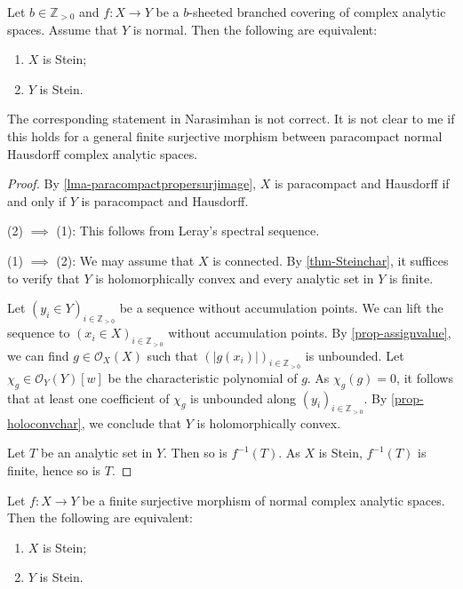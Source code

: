 \begin{lemma}\label{lma-branchedcovstein}
    Let $b\in \mathbb{Z}_{>0}$ and  $f:X\rightarrow Y$ be a $b$-sheeted branched covering of complex analytic spaces. Assume that $Y$ is normal. Then the following are equivalent:
    \begin{enumerate}
        \item $X$ is Stein;
        \item $Y$ is Stein.
    \end{enumerate}
\end{lemma}
The corresponding statement in Narasimhan is not correct. It is not clear to me if this holds for a general finite surjective morphism between paracompact normal Hausdorff complex analytic spaces.
\begin{proof}
    By \cref{lma-paracompactpropersurjimage}, $X$ is paracompact and Hausdorff if and only if $Y$ is paracompact and Hausdorff.

    (2) $\implies$ (1): This follows from Leray's spectral sequence.

    (1) $\implies$ (2): We may assume that $X$ is connected. 
    By \cref{thm-Steinchar}, it suffices to verify that $Y$ is holomorphically convex and every analytic set in $Y$ is finite.
    
    Let $(y_i\in Y)_{i\in \mathbb{Z}_{>0}}$ be a sequence without accumulation points. We can lift the sequence to $(x_i\in X)_{i\in \mathbb{Z}_{>0}}$ without accumulation points. By \cref{prop-assignvalue}, we can find $g\in \mathcal{O}_X(X)$ such that $(|g(x_i)|)_{i\in \mathbb{Z}_{>0}}$ is unbounded. Let $\chi_g\in \mathcal{O}_Y(Y)[w]$ be the characteristic polynomial of $g$. As $\chi_g(g)=0$, it follows that at least one coefficient of $\chi_g$ is unbounded along $(y_i)_{i\in \mathbb{Z}_{>0}}$. By \cref{prop-holoconvchar}, we conclude that $Y$ is holomorphically convex.

    Let $T$ be an analytic set in $Y$. Then so is $f^{-1}(T)$. As $X$ is Stein, $f^{-1}(T)$ is finite, hence so is $T$.
\end{proof}
\begin{corollary}\label{cor-finitemorphismStein2}
    Let $f:X\rightarrow Y$ be a finite surjective morphism of normal complex analytic spaces. Then the following are equivalent:
    \begin{enumerate}
        \item $X$ is Stein;
        \item $Y$ is Stein.
    \end{enumerate}
\end{corollary}
